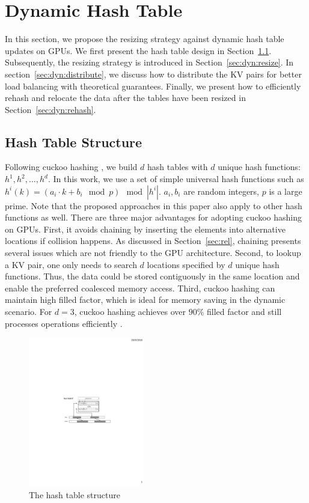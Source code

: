 \section{Dynamic Hash Table}\label{sec:dyn}
In this section, we propose the resizing strategy against dynamic hash table updates on GPUs. We first present the hash table design in Section~\ref{sec:dyn:has}.
Subsequently, the resizing strategy is introduced in Section~\ref{sec:dyn:resize}.
In section~\ref{sec:dyn:distribute}, we discuss how to distribute the KV pairs for better load balancing with theoretical guarantees. 
Finally, we present how to efficiently rehash and relocate the data after the tables have been resized in Section~\ref{sec:dyn:rehash}. 

\subsection{Hash Table Structure}\label{sec:dyn:has}
Following cuckoo hashing \cite{pagh2004cuckoo}, we build $d$ hash tables with $d$ unique hash functions: $h^1,h^2,\ldots,h^d$. 
In this work, we use a set of simple universal hash functions such as $h^i(k) = (a_i\cdot k + b_i \mod p) \mod |h^i|$.
$a_i,b_i$ are random integers, $p$ is a large prime.
Note that the proposed approaches in this paper also apply to other hash functions as well. 
There are three major advantages for adopting cuckoo hashing on GPUs. 
First, it avoids chaining by inserting the elements into alternative locations if collision happens. As discussed in Section~\ref{sec:rel}, 
chaining presents several issues which are not friendly to the GPU architecture.  
Second, to lookup a KV pair, one only needs to search $d$ locations specified by $d$ unique hash functions. 
Thus, the data could be stored contiguously in the same location and enable the preferred coalesced memory access. 
Third, cuckoo hashing can maintain high filled factor, which is ideal for memory saving in the dynamic scenario. 
For $d=3$, cuckoo hashing achieves over $90\%$ filled factor and still processes  operations efficiently \cite{fotakis2005space}.

\begin{figure}[t]
	\centering
	\includegraphics[width=0.45\textwidth]{fig/Hashtable.pdf}
	\caption{The hash table structure}
	\label{fig:hashtable}
\end{figure}

